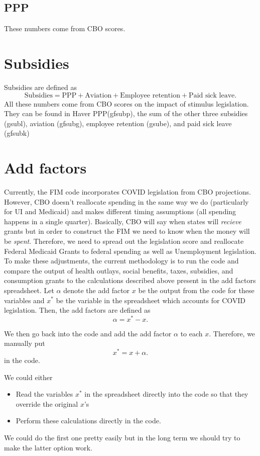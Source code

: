 \documentclass[a4paper]{article}
\begin{document}
\subsection{PPP}
These numbers come from CBO scores.

\section{Subsidies}
Subsidies are defined as
\[
\text{Subsidies} = \text{PPP}+\text{Aviation}+\text{Employee retention}+\text{Paid sick leave}
.\] 
All these numbers come from CBO scores on the impact of stimulus legislation. They can be found in
Haver PPP(gfsubp), the sum of the other three subsidies (gsubl), aviation (gfsubg), employee
retention (gsube), and paid sick leave (gfsubk)

\section{Add factors}
Currently, the FIM code incorporates COVID legislation from CBO projections. However, CBO doesn't
reallocate spending in the same way we do (particularly for UI and Medicaid) and makes different
timing assumptions (all spending happens in a single quarter). Basically, CBO will say when states
will \emph{recieve} grants but in order to construct the FIM we need to know when the money
will be \emph{spent}. Therefore, we need to spread out the
legislation score and reallocate Federal Medicaid Grants to federal spending as well as Unemployment
legislation. To make these adjustments, the current
methodology is to run the code and compare the output of health outlays, social benefits, taxes,
subsidies, and consumption grants to the calculations described above present in the add factors
spreadsheet. Let $\alpha$ denote the add factor $x$ be the output from the code for these variables 
and $x^{*}$ be the variable in the spreadsheet which accounts for COVID legislation. Then, the add
factors are defined as
\[
\alpha = x^{*} - x
.\] 

We then go back into the code and add the add factor  $\alpha$ to each $x$. Therefore, we manually
put
 \[
x^{*} = x + \alpha
.\] 
in the code. 

\remark
We could either 
\begin{itemize}
  \item Read the variables $x^{*}$ in the spreadsheet directly into the code so that they override the
    original  $x$'s 
  \item Perform these calculations directly in the code.   
\end{itemize}

We could do the first one pretty easily but in the long term we should try to make the latter option
work. 
\end{document}
